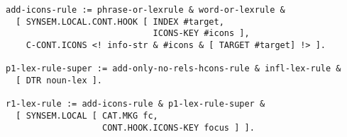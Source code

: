 \documentclass[a4paper]{article}
\begin{document}
{\small\begin{verbatim}
add-icons-rule := phrase-or-lexrule & word-or-lexrule &
  [ SYNSEM.LOCAL.CONT.HOOK [ INDEX #target,
                             ICONS-KEY #icons ],
    C-CONT.ICONS <! info-str & #icons & [ TARGET #target] !> ].

p1-lex-rule-super := add-only-no-rels-hcons-rule & infl-lex-rule &
  [ DTR noun-lex ].

r1-lex-rule := add-icons-rule & p1-lex-rule-super &
  [ SYNSEM.LOCAL [ CAT.MKG fc,
                   CONT.HOOK.ICONS-KEY focus ] ].
\end{verbatim}}
\end{document}
